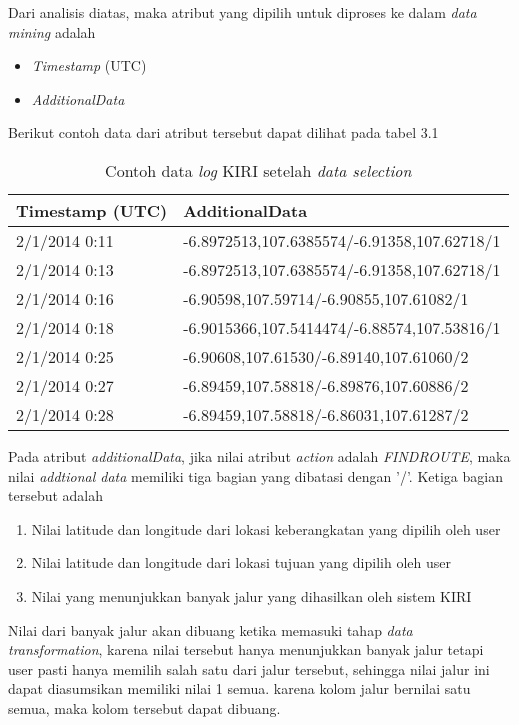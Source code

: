 Dari analisis diatas, maka atribut yang dipilih untuk diproses ke dalam \textsl{data mining} adalah
\begin{itemize}
	\item \textsl{Timestamp} (UTC)
	\item \textsl{AdditionalData}
\end{itemize}

Berikut contoh data dari atribut tersebut dapat dilihat pada tabel 3.1
\begin{table}[h]
\caption{Contoh data \textsl{log} KIRI setelah \textsl{data selection}}
\begin{tabular}{|l|l|}
\hline
\textbf{Timestamp (UTC)} & \textbf{AdditionalData}                     \\ \hline
2/1/2014 0:11            & -6.8972513,107.6385574/-6.91358,107.62718/1 \\ \hline
2/1/2014 0:13            & -6.8972513,107.6385574/-6.91358,107.62718/1 \\ \hline
2/1/2014 0:16            & -6.90598,107.59714/-6.90855,107.61082/1     \\ \hline
2/1/2014 0:18            & -6.9015366,107.5414474/-6.88574,107.53816/1 \\ \hline
2/1/2014 0:25            & -6.90608,107.61530/-6.89140,107.61060/2     \\ \hline
2/1/2014 0:27            & -6.89459,107.58818/-6.89876,107.60886/2     \\ \hline
2/1/2014 0:28            & -6.89459,107.58818/-6.86031,107.61287/2     \\ \hline
\end{tabular}
\end{table}

Pada atribut \textsl{additionalData}, jika nilai atribut \textsl{action} adalah \textsl{FINDROUTE}, maka nilai \textsl{addtional data} memiliki tiga bagian yang dibatasi dengan '/'. Ketiga bagian tersebut adalah

\begin{enumerate}
	\item Nilai latitude dan longitude dari lokasi keberangkatan yang dipilih oleh user
	\item Nilai latitude dan longitude dari lokasi tujuan yang dipilih oleh user
	\item Nilai yang menunjukkan banyak jalur yang dihasilkan oleh sistem KIRI
\end{enumerate}

Nilai dari banyak jalur akan dibuang ketika memasuki tahap \textsl{data transformation}, karena nilai tersebut hanya menunjukkan banyak jalur tetapi user pasti hanya memilih salah satu dari jalur tersebut, sehingga nilai jalur ini dapat diasumsikan memiliki nilai 1 semua. karena kolom jalur bernilai satu semua, maka kolom tersebut dapat dibuang.

